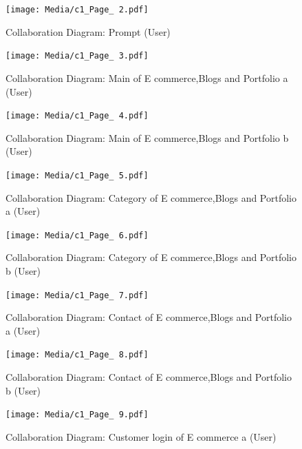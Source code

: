 \documentclass[12pt]{report}
\begin{document}
\begin{figure}[ht]
    \centering
    \texttt{[image: Media/c1\_Page\_ 2.pdf]} %
    \caption{Collaboration Diagram: Prompt (User)}
    \label{fig:drawing1}
\end{figure}

\begin{figure}[ht]
    \centering
    \texttt{[image: Media/c1\_Page\_ 3.pdf]} %
    \caption{Collaboration Diagram: Main of E commerce,Blogs and Portfolio a (User)}
    \label{fig:drawing1}
\end{figure}

\begin{figure}[ht]
    \centering
    \texttt{[image: Media/c1\_Page\_ 4.pdf]} %
    \caption{Collaboration Diagram: Main of E commerce,Blogs and Portfolio b (User)}
    \label{fig:drawing1}
\end{figure}

\begin{figure}[ht]
    \centering
    \texttt{[image: Media/c1\_Page\_ 5.pdf]} %
    \caption{Collaboration Diagram: Category of E commerce,Blogs and Portfolio a (User)}
    \label{fig:drawing1}
\end{figure}

\begin{figure}[ht]
    \centering
    \texttt{[image: Media/c1\_Page\_ 6.pdf]} %
    \caption{Collaboration Diagram: Category of E commerce,Blogs and Portfolio b (User)}
    \label{fig:drawing1}
\end{figure}

\begin{figure}[ht]
    \centering
    \texttt{[image: Media/c1\_Page\_ 7.pdf]} %
    \caption{Collaboration Diagram: Contact of E commerce,Blogs and Portfolio a (User)}
    \caption{}
    \label{fig:drawing1}
\end{figure}

\begin{figure}[ht]
    \centering
    \texttt{[image: Media/c1\_Page\_ 8.pdf]} %
    \caption{Collaboration Diagram: Contact of E commerce,Blogs and Portfolio b (User)}
    \label{fig:drawing1}
\end{figure}

\begin{figure}[ht]
    \centering
    \texttt{[image: Media/c1\_Page\_ 9.pdf]} %
    \caption{Collaboration Diagram: Customer login of E commerce a (User)}
    \label{fig:drawing1}
\end{figure}
\end{document}
